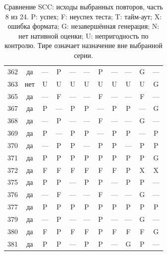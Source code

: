 \begin{table}[p]
\begin{tabular*}{\textwidth}{@{\extracolsep{\fill}}rc*{9}{c}@{}}
362 & да & — & P & — & — & P & — & — & G & —\\
363 & нет & U & U & U & U & U & U & U & U & G\\
365 & да & — & F & — & — & F & — & — & F & —\\
367 & да & P & — & P & P & — & P & P & — & G\\
368 & да & — & P & — & — & F & — & — & G & —\\
369 & да & P & — & P & P & — & P & P & — & P\\
370 & да & — & P & P & — & P & P & — & P & P\\
371 & да & P & P & P & P & P & P & P & P & G\\
372 & да & F & F & F & F & F & F & P & X & X\\
375 & да & P & P & — & P & P & — & P & P & —\\
376 & да & — & F & — & — & F & — & — & G & —\\
377 & да & P & P & P & P & P & P & P & P & P\\
379 & да & — & P & — & — & P & — & — & G & —\\
380 & да & F & P & F & F & P & F & F & F & G\\
381 & да & P & P & — & P & P & — & G & P & —\\
\bottomrule\end{tabular*}
\caption{Сравнение SCC: исходы выбранных повторов, часть 8 из 24. P: успех; F: неуспех теста; T: тайм-аут; X: ошибка формата; G: незавершённая генерация; N: нет нативной оценки; U: непригодность по контролю. Тире означает назначение вне выбранной серии.}
\end{table}
\clearpage
